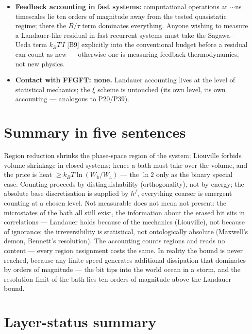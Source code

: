\begin{itemize}[leftmargin=1.4em,itemsep=0.35em]
  \item \textbf{Feedback accounting in fast systems:} computational operations at
        ${\sim}$ns timescales lie ten orders of magnitude away from the tested
        quasistatic regime; there the $B/\tau$ term dominates everything. Anyone
        wishing to measure a Landauer-like residual in fast recurrent systems must
        take the Sagawa--Ueda term $k_B T\,I$ [B9] explicitly into the conventional
        budget before a residual can count as new --- otherwise one is measuring
        feedback thermodynamics, not new physics.
  \item \textbf{Contact with FFGFT: none.} Landauer accounting lives at the level
        of statistical mechanics; the $\xi$ scheme is untouched (its own level,
        its own accounting --- analogous to P20/P39).
\end{itemize}

\section{Summary in five sentences}

Region reduction shrinks the phase-space region of the system; Liouville forbids
volume shrinkage in closed systems; hence a bath must take over the volume, and
the price is heat $\ge k_B T \ln(W_{\text{b}}/W_{\text{a}})$ --- the $\ln 2$ only
as the binary special case. Counting proceeds by distinguishability
(orthogonality), not by energy; the absolute base discretisation is supplied by
$h^f$, everything coarser is emergent counting at a chosen level. Not measurable
does not mean not present: the microstates of the bath all still exist, the
information about the erased bit sits in correlations --- Landauer holds because
of the mechanics (Liouville), not because of ignorance; the irreversibility is
statistical, not ontologically absolute (Maxwell's demon, Bennett's resolution).
The accounting counts regions and reads no content --- every region assignment
costs the same. In reality the bound is never reached, because any finite speed
generates additional dissipation that dominates by orders of magnitude --- the bit
tips into the world ocean in a storm, and the resolution limit of the bath lies
ten orders of magnitude above the Landauer bound.

\section{Layer-status summary}

